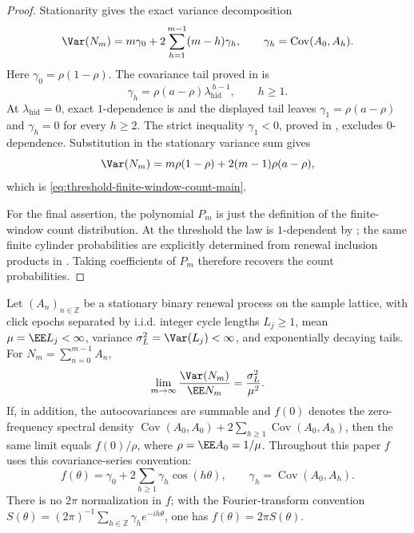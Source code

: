\begin{proof}
Stationarity gives the exact variance decomposition
\[
\Var(N_m)
=m\gamma_0+2\sum_{h=1}^{m-1}(m-h)\gamma_h,
\qquad
\gamma_h=\operatorname{Cov}(A_0,A_h).
\]
Here \(\gamma_0=\rho(1-\rho)\).  The covariance tail proved in
 is
\[
\gamma_h=\rho(a-\rho)\lambda_{\mathrm{hid}}^{\,h-1},
\qquad h\ge1.
\]
At \(\lambda_{\mathrm{hid}}=0\), exact \(1\)-dependence is
 and the displayed tail leaves
\(\gamma_1=\rho(a-\rho)\) and \(\gamma_h=0\) for every \(h\ge2\).
The strict inequality \(\gamma_1<0\), proved in
, excludes \(0\)-dependence.
Substitution
in the stationary variance sum gives
\[
\Var(N_m)
=m\rho(1-\rho)+2(m-1)\rho(a-\rho),
\]
which is \eqref{eq:threshold-finite-window-count-main}.

For the final assertion, the polynomial \(P_m\) is just the definition of the
finite-window count distribution.  At the threshold the law is \(1\)-dependent
by ; the same finite cylinder probabilities
are explicitly determined from renewal inclusion products in
.  Taking coefficients of \(P_m\) therefore
recovers the count probabilities.
\end{proof}

\begin{lemma}\label{lem:discrete-renewal-fano-main}
Let \((A_n)_{n\in\mathbb Z}\) be a stationary binary renewal process on the
sample lattice, with click epochs separated by i.i.d. integer cycle lengths
\(L_j\ge1\), mean \(\mu=\EE L_j<\infty\), variance
\(\sigma_L^2=\Var(L_j)<\infty\), and exponentially decaying tails.  For
\(N_m=\sum_{n=0}^{m-1}A_n\),
\begin{equation}\label{eq:discrete-renewal-fano-identity-main}
\lim_{m\to\infty}\frac{\Var(N_m)}{\EE N_m}
=\frac{\sigma_L^2}{\mu^2}.
\end{equation}
If, in addition, the autocovariances are summable and \(f(0)\) denotes the
zero-frequency spectral density
\(\operatorname{Cov}(A_0,A_0)+2\sum_{h\ge1}\operatorname{Cov}(A_0,A_h)\),
then the same limit equals \(f(0)/\rho\), where \(\rho=\EE A_0=1/\mu\).
Throughout this paper \(f\) uses this covariance-series convention:
\[
f(\theta)=\gamma_0+2\sum_{h\ge1}\gamma_h\cos(h\theta),
\qquad
\gamma_h=\operatorname{Cov}(A_0,A_h).
\]
There is no \(2\pi\) normalization in \(f\); with the Fourier-transform
convention \(S(\theta)=(2\pi)^{-1}\sum_{h\in\mathbb Z}\gamma_he^{-ih\theta}\),
one has \(f(\theta)=2\pi S(\theta)\).
\end{lemma}

